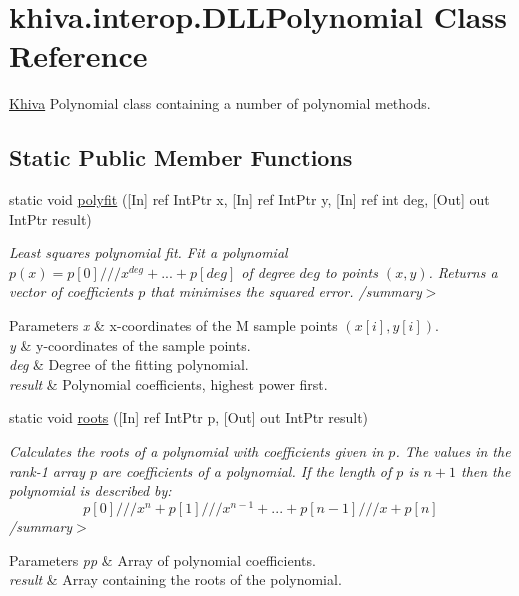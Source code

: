 \hypertarget{classkhiva_1_1interop_1_1_d_l_l_polynomial}{}\section{khiva.\+interop.\+D\+L\+L\+Polynomial Class Reference}
\label{classkhiva_1_1interop_1_1_d_l_l_polynomial}


\mbox{\hyperlink{classkhiva_1_1_khiva}{Khiva}} Polynomial class containing a number of polynomial methods.  


\subsection*{Static Public Member Functions}
\begin{DoxyCompactItemize}
\item 
static void \mbox{\hyperlink{classkhiva_1_1interop_1_1_d_l_l_polynomial_ac96d70c8bbeb29a608542fa9310534dc}{polyfit}} (\mbox{[}In\mbox{]} ref Int\+Ptr x, \mbox{[}In\mbox{]} ref Int\+Ptr y, \mbox{[}In\mbox{]} ref int deg, \mbox{[}Out\mbox{]} out Int\+Ptr result)
\begin{DoxyCompactList}\small\item\em Least squares polynomial fit. Fit a polynomial $p(x) = p[0] /// x^{deg} + ... + p[deg]$ of degree $deg$ to points $(x, y)$. Returns a vector of coefficients $p$ that minimises the squared error. /summary$>$ 
\begin{DoxyParams}{Parameters}
{\em x} & x-\/coordinates of the M sample points $(x[i], y[i])$.\\
\hline
{\em y} & y-\/coordinates of the sample points.\\
\hline
{\em deg} & Degree of the fitting polynomial.\\
\hline
{\em result} & Polynomial coefficients, highest power first.\\
\hline
\end{DoxyParams}
\end{DoxyCompactList}\item 
static void \mbox{\hyperlink{classkhiva_1_1interop_1_1_d_l_l_polynomial_a31f25fb318fb1fe8f4b4c1684e355f96}{roots}} (\mbox{[}In\mbox{]} ref Int\+Ptr p, \mbox{[}Out\mbox{]} out Int\+Ptr result)
\begin{DoxyCompactList}\small\item\em Calculates the roots of a polynomial with coefficients given in $p$. The values in the rank-\/1 array $p$ are coefficients of a polynomial. If the length of $p$ is $n+1$ then the polynomial is described by\+: \[ p[0] /// x^n + p[1] /// x^{n-1} + ... + p[n-1] /// x + p[n] \] /summary$>$ 
\begin{DoxyParams}{Parameters}
{\em pp} & Array of polynomial coefficients.\\
\hline
{\em result} & Array containing the roots of the polynomial.\\
\hline
\end{DoxyParams}
\end{DoxyCompactList}\end{DoxyCompactItemize}


